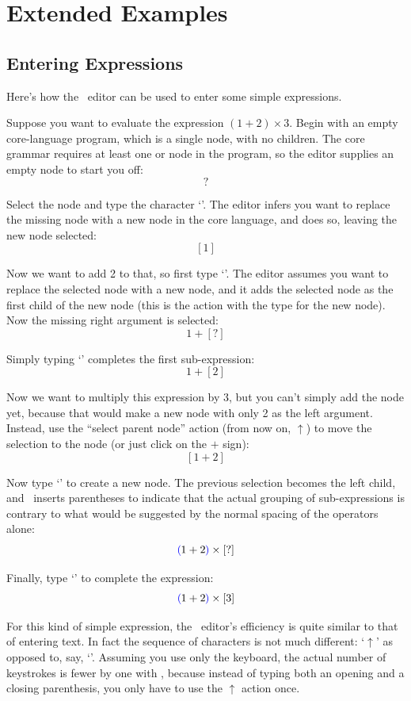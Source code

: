 \chapter{Extended Examples}
\label{examples}

\section{Entering Expressions}
Here's how the \Meta\ editor can be used to enter some simple expressions.

Suppose you want to evaluate the expression $(1+2) \times 3$. Begin with an empty core-language program, which is a single  node, with no children. The core grammar requires at least one  or  node in the program, so the editor supplies an empty node to start you off:
$$?$$

Select the node and type the character `'. The editor infers you want to replace the missing node with a new  node in the core language, and does so, leaving the new node selected:
$$[1]$$

Now we want to add 2 to that, so first type `\clojure{+}'. The editor assumes you want to replace the selected node with a new  node, and it adds the selected node as the first child of the new node (this is the  action with the type  for the new node). Now the missing right argument is selected:
$$1+[?]$$

Simply typing `' completes the first sub-expression:
$$1+[2]$$

Now we want to multiply this expression by 3, but you can't simply add the  node yet, because that would make a new node with only 2 as the left argument. Instead, use the ``select parent node'' action (from now on, $\uparrow$) to move the selection to the  node (or just click on the $+$ sign):
$$[1+2]$$

Now type `\clojure{*}' to create a new node. The previous selection becomes the left child, and \Meta\ inserts parentheses to indicate that the actual grouping of sub-expressions is contrary to what would be suggested by the normal spacing of the operators alone:
$${\color{blue}\left(\!\right.} 1+2 {\color{blue}\left.\!\right)} \times [?]$$

Finally, type `' to complete the expression:
$${\color{blue}\left(\!\right.} 1+2 {\color{blue}\left.\!\right)} \times [3]$$

For this kind of simple expression, the \Meta\ editor's efficiency is quite similar to that of entering text. In fact the sequence of characters is not much different: `$\uparrow$' as opposed to, say, `'. Assuming you use only the keyboard, the actual number of keystrokes is fewer by one with \Meta, because instead of typing both an opening and a closing parenthesis, you only have to use the $\uparrow$ action once.

